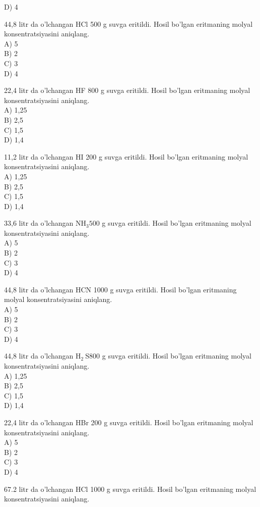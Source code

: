 D) 4
  \item 44,8 litr da o'lchangan HCl 500 g suvga eritildi. Hosil bo'lgan eritmaning molyal konsentratsiyasini aniqlang.\\
A) 5\\
B) 2\\
C) 3\\
D) 4\\
  \item 22,4 litr da o'lchangan HF 800 g suvga eritildi. Hosil bo'lgan eritmaning molyal konsentratsiyasini aniqlang.\\
A) 1,25\\
B) 2,5\\
C) 1,5\\
D) 1,4
  \item 11,2 litr da o'lchangan HI 200 g suvga eritildi. Hosil bo'lgan eritmaning molyal konsentratsiyasini aniqlang.\\
A) 1,25\\
B) 2,5\\
C) 1,5\\
D) 1,4
  \item 33,6 litr da o'lchangan $\mathrm{NH}_{3} 500$ g suvga eritildi. Hosil bo'lgan eritmaning molyal konsentratsiyasini aniqlang.\\
A) 5\\
B) 2\\
C) 3\\
D) 4
  \item 44,8 litr da o'lchangan HCN 1000 g suvga eritildi. Hosil bo'lgan eritmaning molyal konsentratsiyasini aniqlang.\\
A) 5\\
B) 2\\
C) 3\\
D) 4
  \item 44,8 litr da o'lchangan $\mathrm{H}_{2} \mathrm{~S} 800$ g suvga eritildi. Hosil bo'lgan eritmaning molyal konsentratsiyasini aniqlang.\\
A) 1,25\\
B) 2,5\\
C) 1,5\\
D) 1,4
  \item 22,4 litr da o'lchangan HBr 200 g suvga eritildi. Hosil bo'lgan eritmaning molyal konsentratsiyasini aniqlang.\\
A) 5\\
B) 2\\
C) 3\\
D) 4
  \item 67.2 litr da o'lchangan HCl 1000 g suvga eritildi. Hosil bo'lgan eritmaning molyal konsentratsiyasini aniqlang.\\

